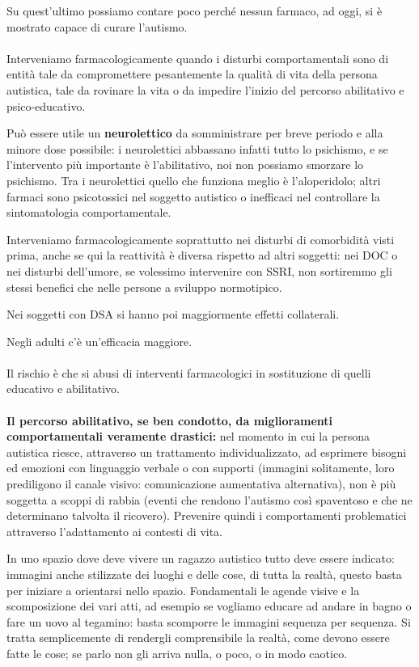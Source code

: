 Su quest'ultimo possiamo contare poco perché nessun farmaco, ad oggi, si
è mostrato capace di curare l'autismo.
\\\\
Interveniamo farmacologicamente quando i disturbi comportamentali sono
di entità tale da compromettere pesantemente la qualità di vita della
persona autistica, tale da rovinare la vita o da impedire l'inizio del
percorso abilitativo e psico-educativo.

Può essere utile un \textbf{neurolettico} da somministrare per breve
periodo e alla minore dose possibile: i neurolettici abbassano infatti
tutto lo psichismo, e se l'intervento più importante è l'abilitativo,
noi non possiamo smorzare lo psichismo. Tra i neurolettici quello che
funziona meglio è l'aloperidolo; altri farmaci sono psicotossici nel
soggetto autistico o inefficaci nel controllare la sintomatologia
comportamentale.

Interveniamo farmacologicamente soprattutto nei disturbi di comorbidità
visti prima, anche se qui la reattività è diversa rispetto ad altri
soggetti: nei DOC o nei disturbi dell'umore, se volessimo intervenire
con SSRI, non sortiremmo gli stessi benefici che nelle persone a
sviluppo normotipico.

Nei soggetti con DSA si hanno poi maggiormente effetti collaterali.

Negli adulti c'è un'efficacia maggiore.
\\\\
Il rischio è che si abusi di interventi farmacologici in sostituzione di
quelli educativo e abilitativo.
\\\\
\textbf{Il percorso abilitativo, se ben condotto, da miglioramenti
comportamentali veramente drastici:} nel momento in cui la persona
autistica riesce, attraverso un trattamento individualizzato, ad
esprimere bisogni ed emozioni con linguaggio verbale o con supporti
(immagini solitamente, loro prediligono il canale visivo: comunicazione
aumentativa alternativa), non è più soggetta a scoppi di rabbia (eventi
che rendono l'autismo così spaventoso e che ne determinano talvolta il
ricovero). Prevenire quindi i comportamenti problematici attraverso
l'adattamento ai contesti di vita.

In uno spazio dove deve vivere un ragazzo autistico tutto deve essere
indicato: immagini anche stilizzate dei luoghi e delle cose, di tutta la
realtà, questo basta per iniziare a orientarsi nello spazio.
Fondamentali le agende visive e la scomposizione dei vari atti, ad
esempio se vogliamo educare ad andare in bagno o fare un uovo al
tegamino: basta scomporre le immagini sequenza per sequenza. Si tratta
semplicemente di rendergli comprensibile la realtà, come devono essere
fatte le cose; se parlo non gli arriva nulla, o poco, o in modo caotico.

